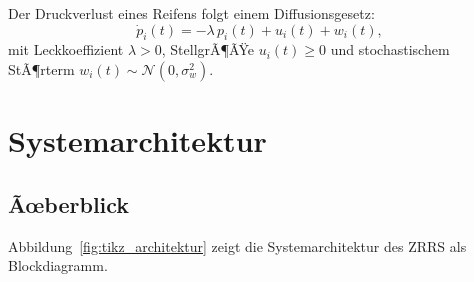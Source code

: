 ﻿\documentclass[a4paper,12pt]{article}
\theoremstyle{definition}
\begin{document}
Der Druckverlust eines Reifens folgt einem Diffusionsgesetz:
\[
    \dot{p}_i(t) = -\lambda\, p_i(t) + u_i(t) + w_i(t),
\]
mit Leckkoeffizient $\lambda > 0$, StellgrÃ¶ÃŸe $u_i(t) \geq 0$ und
stochastischem StÃ¶rterm $w_i(t) \sim \mathcal{N}(0, \sigma_w^2)$.

\section{Systemarchitektur}

\subsection{Ãœberblick}

Abbildung~\ref{fig:tikz_architektur} zeigt die Systemarchitektur des ZRRS
als Blockdiagramm.
\end{document}

